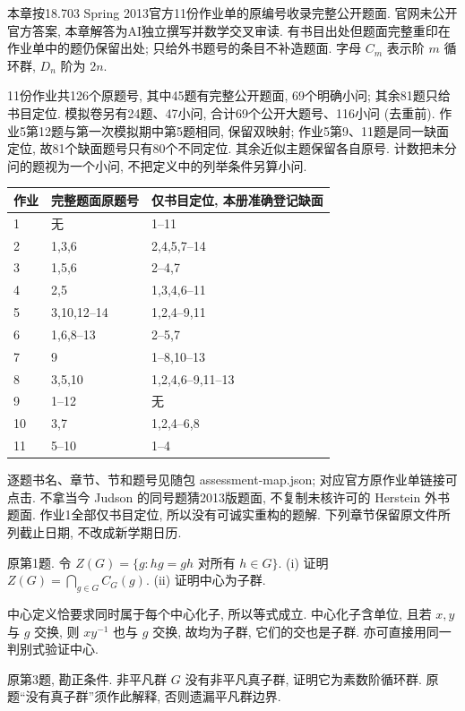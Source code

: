 本章按18.703 Spring 2013官方11份作业单的原编号收录完整公开题面. 官网未公开官方答案, 本章解答为AI独立撰写并数学交叉审读. 有书目出处但题面完整重印在作业单中的题仍保留出处; 只给外书题号的条目不补造题面. 字母 $C_m$ 表示阶 $m$ 循环群, $D_n$ 阶为 $2n$.

11份作业共126个原题号, 其中45题有完整公开题面, 69个明确小问; 其余81题只给书目定位. 模拟卷另有24题、47小问, 合计69个公开大题号、116小问 (去重前). 作业5第12题与第一次模拟期中第5题相同, 保留双映射; 作业5第9、11题是同一缺面定位, 故81个缺面题号只有80个不同定位. 其余近似主题保留各自原号. 计数把未分问的题视为一个小问, 不把定义中的列举条件另算小问.
\begin{longtable}{@{}p{}p{}p{}@{}}
\toprule 作业&完整题面原题号&仅书目定位, 本册准确登记缺面\\\midrule\endhead
1&无&1--11\\
2&1,3,6&2,4,5,7--14\\
3&1,5,6&2--4,7\\
4&2,5&1,3,4,6--11\\
5&3,10,12--14&1,2,4--9,11\\
6&1,6,8--13&2--5,7\\
7&9&1--8,10--13\\
8&3,5,10&1,2,4,6--9,11--13\\
9&1--12&无\\
10&3,7&1,2,4--6,8\\
11&5--10&1--4\\
\bottomrule
\end{longtable}
逐题书名、章节、节和题号见随包 assessment-map.json; 对应官方原作业单链接可点击. 不拿当今 Judson 的同号题猜2013版题面, 不复制未核许可的 Herstein 外书题面. 作业1全部仅书目定位, 所以没有可诚实重构的题解. 下列章节保留原文件所列截止日期, 不改成新学期日历.
\begin{exercise}原第1题. 令 $Z(G)=\{g:hg=gh\text{ 对所有 }h\in G\}$. (i) 证明 $Z(G)=\bigcap_{g\in G}C_G(g)$. (ii) 证明中心为子群.\end{exercise}
\begin{solution}
中心定义恰要求同时属于每个中心化子, 所以等式成立. 中心化子含单位, 且若 $x,y$ 与 $g$ 交换, 则 $xy^{-1}$ 也与 $g$ 交换, 故均为子群, 它们的交也是子群. 亦可直接用同一判别式验证中心.
\end{solution}
\begin{exercise}原第3题, 勘正条件. 非平凡群 $G$ 没有非平凡真子群, 证明它为素数阶循环群. 原题“没有真子群”须作此解释, 否则遗漏平凡群边界.\end{exercise}
